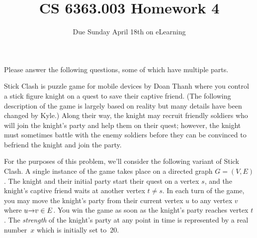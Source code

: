 \documentclass[11pt]{article}
\begin{document}
\title{CS 6363.003 Homework 4}
\author{Due Sunday April 18th on eLearning}
\date{}

\maketitle

Please answer the following  questions, some of which have multiple parts.


\begin{problems}
\item
  Stick Clash is puzzle game for mobile devices by Doan Thanh where you control a stick figure
  knight on a quest to save their captive friend.
  (The following description of the game is largely based on reality but many details have been
  changed by Kyle.)
  Along their way, the knight may recruit friendly soldiers who will join the knight's party and
  help them on their quest;
  however, the knight must sometimes battle with the enemy soldiers before they can be convinced to
  befriend the knight and join the party.

  For the purposes of this problem, we'll consider the following variant of Stick Clash.
  A single instance of the game takes place on a directed graph \(G = (V, E)\).
  The knight and their initial party start their quest on a vertex \(s\), and the knight's captive
  friend waits at another vertex \(t \neq s\).
  In each turn of the game, you may move the knight's party from their current vertex \(u\) to
  any vertex \(v\) where \(u \mathord{\rightarrow} v \in E\).
  You win the game as soon as the knight's party reaches vertex \(t\).
  The \emph{strength} of the knight's party at any point in time is represented by a real
  number~\(x\) which is initially set to~\(20\).


\end{problems}
\end{document}
